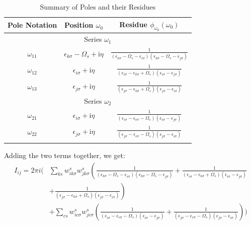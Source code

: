 \documentclass[12pt]{caltech_thesis}
\begin{document}
\begin{table}[h]
\centering
\caption{Summary of Poles and their Residues}
\begin{tabular}{|c|c|c|}
\hline
Pole Notation & Position $\omega_0$ & Residue $\phi_{\omega_0}(\omega_0)$ \\
\hline
\multicolumn{3}{|c|}{Series $\omega_1$} \\
\hline
$\omega_{11}$ & $\epsilon_{k \sigma} - \Omega_s + \mathrm{i} \eta$ & $\frac{1}{(\epsilon_{k \sigma} - \Omega_s -\epsilon_{i \sigma})(\epsilon_{k \sigma} - \Omega_s -\epsilon_{j \sigma})}$ \\
$\omega_{12}$ & $\epsilon_{i \sigma} + \mathrm{i} \eta$ & $\frac{1}{(\epsilon_{i \sigma} -\epsilon_{k \sigma}+\Omega_s)(\epsilon_{i \sigma} -\epsilon_{j \sigma})}$ \\
$\omega_{13}$ & $\epsilon_{j \sigma} + \mathrm{i} \eta$ & $\frac{1}{(\epsilon_{j \sigma} -\epsilon_{k \sigma}+\Omega_s)(\epsilon_{j \sigma} -\epsilon_{i \sigma})}$ \\
\hline
\multicolumn{3}{|c|}{Series $\omega_2$} \\
\hline
$\omega_{21}$ & $\epsilon_{i \sigma} + \mathrm{i} \eta$ & $\frac{1}{(\epsilon_{i \sigma} -\epsilon_{c \sigma}-\Omega_s)(\epsilon_{i \sigma} -\epsilon_{j \sigma})}$ \\
$\omega_{22}$ & $\epsilon_{j \sigma} + \mathrm{i} \eta$ & $\frac{1}{(\epsilon_{j \sigma} -\epsilon_{c \sigma}-\Omega_s)(\epsilon_{j \sigma} -\epsilon_{i \sigma})}$ \\
\hline
\label{tab:poles_residues_occupied}
\end{tabular}
\end{table}
Adding the two terms together, we get:
\begin{equation}
\begin{aligned}
I_{ij} = 2\pi i \Bigg( & \sum_{ks} w_{i k \sigma}^s w_{j k \sigma}^s \left( \frac{1}{(\epsilon_{k \sigma} - \Omega_s - \epsilon_{i \sigma})(\epsilon_{k \sigma} - \Omega_s - \epsilon_{j \sigma})} + \frac{1}{(\epsilon_{i \sigma} - \epsilon_{k \sigma} + \Omega_s)(\epsilon_{i \sigma} - \epsilon_{j \sigma})} \right. \\
& \left. + \frac{1}{(\epsilon_{j \sigma} - \epsilon_{k \sigma} + \Omega_s)(\epsilon_{j \sigma} - \epsilon_{i \sigma})} \right) \\
& + \sum_{cs} w_{i c \sigma}^s w_{j c \sigma}^s \left( \frac{1}{(\epsilon_{i \sigma} - \epsilon_{c \sigma} - \Omega_s)(\epsilon_{i \sigma} - \epsilon_{j \sigma})} + \frac{1}{(\epsilon_{j \sigma} - \epsilon_{c \sigma} - \Omega_s)(\epsilon_{j \sigma} - \epsilon_{i \sigma})} \right) \Bigg)
\end{aligned}
\end{equation}
\end{document}

